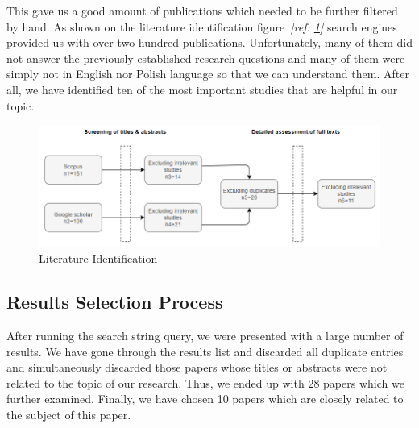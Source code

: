 This gave us a good amount of publications which needed to be further filtered by hand.  As shown on the literature identification figure~\textit{[ref: \ref{fig:literature-identification}]} search engines provided us with over two hundred publications. Unfortunately, many of them did not answer the previously established research questions and many of them were simply not in English nor Polish language so that we can understand them. After all, we have identified ten of the most important studies that are helpful in our topic.

\begin{figure}[htp]
\centering
\includegraphics[width=\linewidth]{img/search_process_new.png}
\caption{Literature Identification}
\label{fig:literature-identification}
\end{figure}

\newpage

\subsection{Results Selection Process}
After running the search string query, we were presented with a large number of results. We have gone through the results list and discarded all duplicate entries and simultaneously discarded those papers whose titles or abstracts were not related to the topic of our research. Thus, we ended up with 28 papers which we further examined. Finally, we have chosen 10 papers which are closely related to the subject of this paper.
